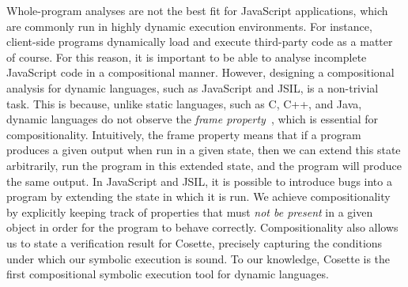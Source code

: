 \documentclass[acmsmall,review,anonymous]{acmart}\settopmatter{printfolios=true,printccs=false,printacmref=false}
\newcommand{\jsil}{JSIL\xspace}
\newcommand{\cosette}{Cosette\xspace}
\newcommand{\myparagraph}[1]{\smallskip\noindent {\bf #1.}\hspace{1pt}}
\begin{document}
\myparagraph{Novelty: Compositionality} 
Whole-program analyses are not the best fit for JavaScript applications, which are commonly run in highly dynamic execution environments. For instance, client-side programs dynamically load and execute third-party code as a matter of course. For this reason, it is important to be able to analyse incomplete JavaScript code in a compositional manner.
However, designing a compositional analysis for dynamic languages, such as JavaScript and \jsil, is a non-trivial task. This is because, unlike static languages, such as C, C++, and Java, dynamic languages do not observe the \emph{frame property}~\cite{?}, which is essential for compositionality. Intuitively,  the frame property means that if a program produces a given output when run in a given state, then we can extend this state arbitrarily, run the program in this extended state, and the program will produce the same output. In JavaScript and \jsil, it is possible to introduce bugs into a program by extending the state in which it is run. 
%
We achieve compositionality by explicitly keeping track of properties that must {\em not be present} in a given object in order for the program to behave correctly.
Compositionality also allows us to state a verification result for \cosette, precisely capturing the conditions under which our symbolic execution is sound.
To our knowledge, \cosette is the first compositional symbolic execution tool for dynamic languages.
%
%
%
%
%
%
\end{document}
